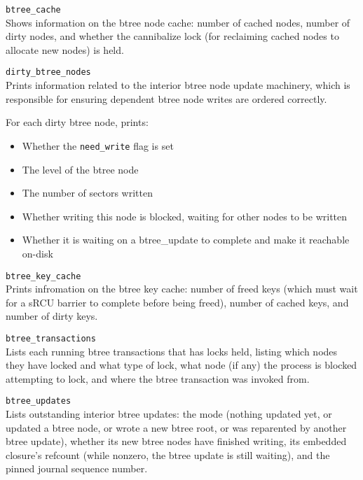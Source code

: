 \documentclass{article}
\begin{document}
\begin{description}
	\item \texttt{btree\_cache} \\
		Shows information on the btree node cache: number of cached
		nodes, number of dirty nodes, and whether the cannibalize lock
		(for reclaiming cached nodes to allocate new nodes) is held.

	\item \texttt{dirty\_btree\_nodes} \\
		Prints information related to the interior btree node update
		machinery, which is responsible for ensuring dependent btree
		node writes are ordered correctly.

		For each dirty btree node, prints:
		\begin{itemize}
			\item Whether the \texttt{need\_write} flag is set
			\item The level of the btree node
			\item The number of sectors written
			\item Whether writing this node is blocked, waiting for
				other nodes to be written
			\item Whether it is waiting on a btree\_update to
				complete and make it reachable on-disk
		\end{itemize}

	\item \texttt{btree\_key\_cache} \\
		Prints infromation on the btree key cache: number of freed keys
		(which must wait for a sRCU barrier to complete before being
		freed), number of cached keys, and number of dirty keys.

	\item \texttt{btree\_transactions} \\
		Lists each running btree transactions that has locks held,
		listing which nodes they have locked and what type of lock, what
		node (if any) the process is blocked attempting to lock, and
		where the btree transaction was invoked from.

	\item \texttt{btree\_updates} \\
		Lists outstanding interior btree updates: the mode (nothing
		updated yet, or updated a btree node, or wrote a new btree root,
		or was reparented by another btree update), whether its new
		btree nodes have finished writing, its embedded closure's
		refcount (while nonzero, the btree update is still waiting), and
		the pinned journal sequence number.


\end{description}
\end{document}
